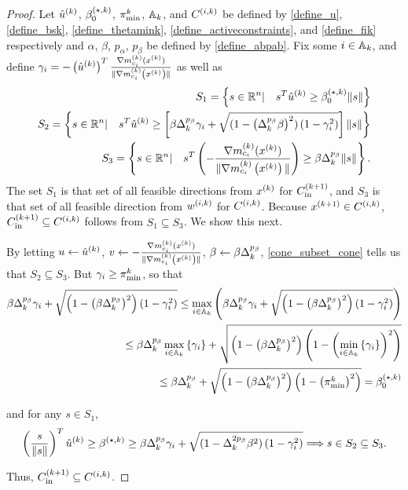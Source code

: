\begin{proof}
Let 
${{\hat u}^{(k)}}$, ${\beta_0^{(\star, k)}}$, ${\pi^k_{\textrm{min}}}$, ${\mathbb A_{k}}$, and ${C^{(i, k)}}$
be defined by
\cref{define_u}, \cref{define_bsk}, \cref{define_thetamink}, \cref{define_activeconstraints}, and \cref{define_fik} 
respectively and $\alpha$, $\beta$, $p_{\alpha}$, $p_{\beta}$ be defined by \cref{define_abpab}.
Fix some $i \in {\mathbb A_{k}}$, and define $\gamma_i = -\left({{\hat u}^{(k)}}\right)^T{\frac{\nabla m^{(k)}_{c_i}(x^{(k)})}{\|\nabla m^{(k)}_{c_i}\left(x^{(k)}\right)\|}}$ as well as
\begin{align*}
S_1 = \left\{s\in\mathbb R^n | \quad s^T{{\hat u}^{(k)}}\ge{\beta_0^{(\star, k)}}\|s\| \right\} \\
S_2 = \left\{s\in\mathbb R^n | \quad s^T{{\hat u}^{(k)}}\ge\left[\beta\Delta_k^{p_{\beta}}\gamma_i + \sqrt{(1 - \left(\Delta_k^{p_{\beta}}\beta\right)^2)\left(1 - \gamma_i^2\right)}\right]\|s\| \right\} \\
S_3 = \left\{s\in\mathbb R^n | \quad s^T\left(-{\frac{\nabla m^{(k)}_{c_i}(x^{(k)})}{\|\nabla m^{(k)}_{c_i}\left(x^{(k)}\right)\|}}\right)\ge\beta\Delta_k^{p_{\beta}}\|s\| \right\}.
\end{align*}
The set $S_1$ is that set of all feasible directions from $x^{(k)}$ for ${C^{(k+1)}_{\textrm{in}}}$, and $S_3$ is that set of all feasible direction from ${w^{(i, k)}}$ for ${C^{(i, k)}}$.
Because ${{x}^{(k+1)}} \in {C^{(i, k)}}$, ${C^{(k+1)}_{\textrm{in}}} \subseteq {C^{(i, k)}}$ follows from $S_1 \subseteq S_3$.
We show this next.


By letting $u \gets {{\hat u}^{(k)}}$, $v \gets -{\frac{\nabla m^{(k)}_{c_i}(x^{(k)})}{\|\nabla m^{(k)}_{c_i}\left(x^{(k)}\right)\|}}$, $\beta \gets \beta \Delta_k^{p_{\beta}}$, \cref{cone_subset_cone} tells us that
$S_2 \subseteq S_3$.
But $\gamma_i \ge {\pi^k_{\textrm{min}}}$, so that
\begin{align*}
\beta\Delta_k^{p_{\beta}}\gamma_i + \sqrt{\left(1 - \left(\beta\Delta_k^{p_{\beta}}\right)^2\right)\left(1 - \gamma_i^2\right)}
\le \max_{i\in{\mathbb A_{k}}} \left(\beta\Delta_k^{p_{\beta}}\gamma_i + \sqrt{\left(1 - \left(\beta\Delta_k^{p_{\beta}}\right)^2\right)\left(1 - \gamma_i^2\right)}\right) \\
\le \beta\Delta_k^{p_{\beta}} \max_{i\in{\mathbb A_{k}}}\left\{\gamma_i\right\} + \sqrt{\left(1 - \left(\beta\Delta_k^{p_{\beta}}\right)^2\right)\left(1 - \left(\min_{i\in{\mathbb A_{k}}}\left\{\gamma_i\right\}\right)^2\right)} \\
\le \beta\Delta_k^{p_{\beta}} + \sqrt{\left(1 - \left(\beta\Delta_k^{p_{\beta}}\right)^2\right)\left(1 - \left({\pi^k_{\textrm{min}}}\right)^2\right)} = {\beta_0^{(\star, k)}}
\end{align*}

and for any $s\in S_1$,
\begin{align*}
\left(\frac{s}{\|s\|}\right)^T{{\hat u}^{(k)}} \ge {\beta^{(\star, k)}} 
\ge \beta\Delta_k^{p_{\beta}}\gamma_i + \sqrt{(1 - \Delta_k^{2p_{\beta}}\beta^2)\left(1 - \gamma_i^2\right)}
\Longrightarrow s \in S_2 \subseteq S_3.
\end{align*}

Thus, ${C^{(k+1)}_{\textrm{in}}} \subseteq {C^{(i, k)}}$.
\end{proof}


